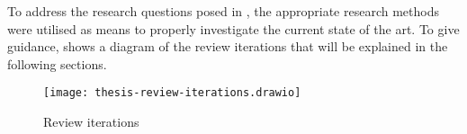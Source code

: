 To address the research questions posed in , the
appropriate research methods were utilised as means to properly investigate the
current state of the art. To give guidance,
 shows a diagram of the review iterations that will
be explained in the following sections.

\begin{figure*}[!htb]
  \centering
  \texttt{[image: thesis-review-iterations.drawio]}
  \caption{Review iterations}
  \label{fig:review-iterations}
\end{figure*}
